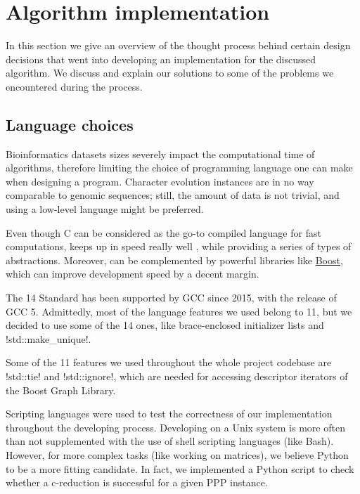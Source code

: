
\section{Algorithm implementation}\label{section:implementation}

In this section we give an overview of the thought process behind certain design decisions that went into developing an implementation for the discussed algorithm.
We discuss and explain our solutions to some of the problems we encountered during the process.

\subsection{Language choices}\label{section:language-choices}

Bioinformatics datasets sizes severely impact the computational time of algorithms, therefore limiting the choice of programming language one can make when designing a program.
Character evolution instances are in no way comparable to genomic sequences; still, the amount of data is not trivial, and using a low-level language might be preferred.

Even though C can be considered as the go-to compiled language for fast computations, \cc{} keeps up in speed really well \cite{PLB2008}, while providing a series of types of abstractions.
Moreover, \cc{} can be complemented by powerful libraries like \href{http://www.boost.org/}{Boost}, which can improve development speed by a decent margin.

The \cc{}14 Standard has been supported by GCC since 2015, with the release of GCC 5.
Admittedly, most of the language features we used belong to \cc{}11, but we decided to use some of the \cc{}14 ones, like brace-enclosed initializer lists and !std::make_unique!.

Some of the \cc{}11 features we used throughout the whole project codebase are !std::tie! and !std::ignore!, which are needed for accessing descriptor iterators of the Boost Graph Library.

Scripting languages were used to test the correctness of our implementation throughout the developing process.
Developing on a Unix system is more often than not supplemented with the use of shell scripting languages (like Bash).
However, for more complex tasks (like working on matrices), we believe Python to be a more fitting candidate.
In fact, we implemented a Python script to check whether a c-reduction is successful for a given PPP instance.

